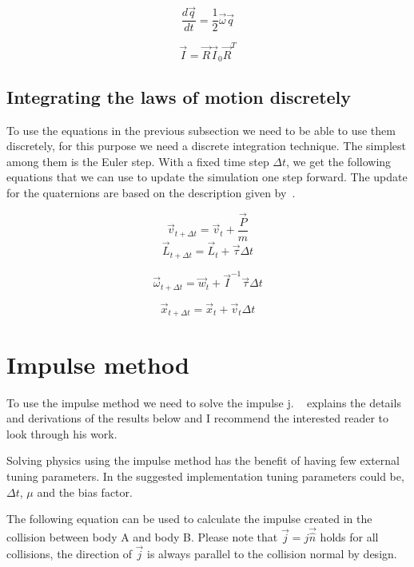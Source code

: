 \begin{equation}
  \frac{d\vec{q}}{dt} = \frac{1}{2}\vec{\omega}\vec{q}
\end{equation}

\begin{equation}
  \vec{I} = \vec{R}\vec{I}_0\vec{R}^T
\end{equation}

\subsection{Integrating the laws of motion discretely}
To use the equations in the previous subsection we need to be able to use them
discretely, for this purpose we need a discrete integration technique. The
simplest among them is the Euler step. With a fixed time step $\Delta t$, we
get the following equations that we can use to update the simulation one step
forward. The update for the quaternions are based on the description given by~\cite{fossum}.

\begin{equation}
  \vec{v}_{t + \Delta t} = \vec{v}_{t}+\frac{\vec{P}}{m}
\end{equation}
\begin{equation}
  \vec{L}_{t + \Delta t} = \vec{L}_{t}+\vec{\tau}\Delta t
\end{equation}

\begin{equation}
  \vec{\omega}_{t + \Delta t} = \vec{w}_t+\vec{I}^{-1}\vec{\tau}\Delta t
\end{equation}

\begin{equation}
  \vec{x}_{t + \Delta t} = \vec{x}_{t} + \vec{v}_t\Delta t
\end{equation}

\section{Impulse method}\label{sec:imp}
To use the impulse method we need to solve the impulse j. ~\cite{baraff} explains the details
and derivations of the results below and I recommend the interested reader to look through
his work.

Solving physics using the impulse method has the benefit of having few external tuning
parameters. In the suggested implementation tuning parameters could be, $\Delta t$,
$\mu$ and the bias factor.

The following equation can be used to calculate the impulse created in the
collision between body A and body B.
Please note that $\vec{j} = j\vec{\hat{n}}$ holds for all collisions, the direction
of $\vec{j}$ is always parallel to the collision normal by design.


